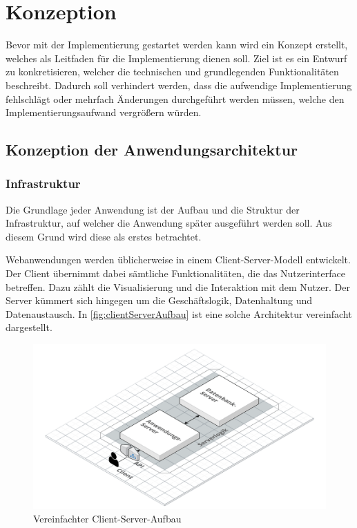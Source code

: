 \chapter{Konzeption}
Bevor mit der Implementierung gestartet werden kann wird ein Konzept erstellt, welches als Leitfaden für die Implementierung dienen soll.
Ziel ist es ein Entwurf zu konkretisieren, welcher die technischen und grundlegenden Funktionalitäten beschreibt.
Dadurch soll verhindert werden, dass die aufwendige Implementierung fehlschlägt oder mehrfach Änderungen durchgeführt werden müssen, welche den Implementierungsaufwand vergrößern würden.


\section{Konzeption der Anwendungsarchitektur}

\subsection{Infrastruktur}
Die Grundlage jeder Anwendung ist der Aufbau und die Struktur der Infrastruktur, auf welcher die Anwendung später ausgeführt werden soll.
Aus diesem Grund wird diese als erstes betrachtet.

Webanwendungen werden üblicherweise in einem Client-Server-Modell entwickelt.
Der Client übernimmt dabei sämtliche Funktionalitäten, die das Nutzerinterface betreffen.
Dazu zählt die Visualisierung und die Interaktion mit dem Nutzer.
Der Server kümmert sich hingegen um die Geschäftslogik, Datenhaltung und Datenaustausch.
In \autoref{fig:clientServerAufbau} ist eine solche Architektur vereinfacht dargestellt.


\begin{figure}[h]
    \centering
    \includegraphics[width=.9\textwidth]{img/ClientServer.png}
    \caption{Vereinfachter Client-Server-Aufbau}
    \label{fig:clientServerAufbau}
\end{figure}

